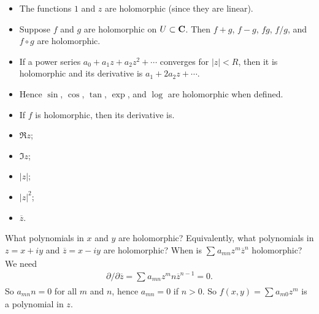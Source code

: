 \documentclass[11pt, oneside,margin=1in]{article}
\begin{document}
 \begin{example}\label{}\text{}
\begin{itemize}
	\item The functions  $1$ and $z$ are holomorphic (since they are linear).
	\item Suppose $f$ and $g$ are holomorphic on $U\subset \mathbf C$. Then $f+g$, $f-g$, $fg$, $f/g$, and $f\circ g$ are holomorphic.
	\item If a power series $a_0 + a_1z + a_2z^2 + \cdots$ converges for $\left\lvert z \right\rvert <R$, then it is holomorphic and its derivative is $a_1 + 2a_2z + \cdots$.
	\item Hence $\sin$, $\cos$, $\tan$, $\exp$, and $\log$ are holomorphic when defined.
	\item If $f$ is holomorphic, then its derivative is. 
\end{itemize}
\end{example}

\begin{example}\label{}\text{}
\begin{itemize}
	\item $\Re z$;
	\item $\Im z$;
	\item $\left\lvert z \right\rvert$;
	\item $\left\lvert z \right\rvert ^2$;
	\item $\overline{z}$.
\end{itemize}
\end{example}

What polynomials in $x$ and $y$ are holomorphic? Equivalently, what polynomials in $z=x+iy$ and $\overline{z}=x-iy$ are holomorphic? When is $\sum_{}^{} a_{mn}z^m \overline{z}^n$ holomorphic? We need
\begin{align*}
	\partial/\partial \overline{z}= \sum_{}^{} a_{mn} z^m n \overline{z}^{n-1} = 0.
\end{align*}
So $a_{mn} n = 0$ for all $m$ and $n$, hence $a_{mn} = 0$ if $n>0$. So $f(x,y)=  \sum_{}^{} a_{m0}z^m$ is a polynomial in $z$.
\end{document}
